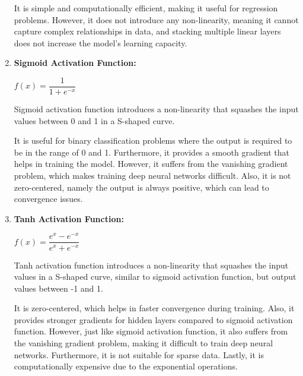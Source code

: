 \documentclass[12pt,letterpaper, onecolumn]{exam}
\begin{document}
\begin{questions}
\begin{parts}
\begin{solution}
\begin{enumerate}[label=(\alph*)]
                It is simple and computationally efficient, making it useful for regression
                problems. However, it does not introduce any non-linearity, meaning it cannot 
                capture complex relationships in data, and stacking multiple linear layers does
                not increase the model’s learning capacity.
                
                \item \textbf{Sigmoid Activation Function:}
                
                \begin{center}
                    $f(x) = \dfrac{1}{1 + e^{-x}}$
                \end{center}

                Sigmoid activation function introduces a non-linearity that squashes the
                input values between 0 and 1 in a S-shaped curve. 
                
                It is useful for binary classification problems where the output is required
                to be in the range of 0 and 1. Furthermore, it provides a smooth gradient that
                helps in training the model. However, it suffers from the vanishing gradient
                problem, which makes training deep neural networks difficult. Also, it is not
                zero-centered, namely the output is always positive, which can lead to 
                convergence issues.

                \pagebreak
                
                \item \textbf{Tanh Activation Function:}
                
                \begin{center}
                    $f(x) = \dfrac{e^x - e^{-x}}{e^x + e^{-x}}$
                \end{center}

                Tanh activation function introduces a non-linearity that squashes the input
                values in a S-shaped curve, similar to sigmoid activation function, but output values 
                between -1 and 1.

                It is zero-centered, which helps in faster convergence during training.
                Also, it provides stronger gradients for hidden layers compared to sigmoid activation function.
                However, just like sigmoid activation function, it also suffers from the 
                vanishing gradient problem, making it difficult to train deep neural networks. 
                Furthermore, it is not suitable for sparse data. Lastly, it is computationally
                expensive due to the exponential operations.
                

\end{enumerate}
\end{solution}
\end{parts}
\end{questions}
\end{document}
